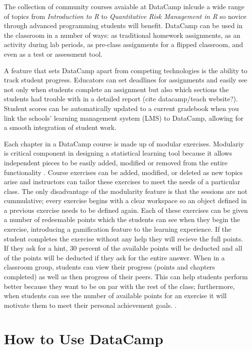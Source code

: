 \documentclass[12pt]{article}
\begin{document}
The collection of community courses avaiable at DataCamp inlcude a wide range of topics from \textit{Introduction to R} to
\textit{Quantitative Risk Management in R} so novice through advanced programming students will benefit.
DataCamp can be used in the classroom in a number of ways: as traditional homework assignments, as an
activity during lab periods, as pre-class assignments for a flipped classroom, and even as a test or assessment tool.

A feature that sets DataCamp apart from competing technologies is the ability to track student progress. Educators
can set deadlines for assignments and easily see not only when students complete an assignment but also which sections the
students had trouble with in a detailed report (cite datacamp/teach website?). Student scores can be automatically updated to a
current gradebook when you link the schools' learning management system (LMS) to DataCamp, allowing for a smooth integration of student work.

Each chapter in a DataCamp course is made up of modular exercises. Modulariy is critical component in designing a statistical
learning tool because it allows independent pieces to be easily added, modified or removed from the entire functionality
\cite{Hare2017}. Course exercises can be added, modified, or deleted as new topics arise and instructors can tailor
these exercises to meet the needs of a particular class. The only disadvantage of the modularity feature is that the sessions
are not cummulative; every exercise begins with a clear workspace so an object defined in a previous exercise needs to be
defined again. Each of these exercises can be given a number of redeemable points which the students can see when they begin
the exercise, introducing a gamification feature to the learning experience. If the student completes the exercise without
any help they will recieve the full points. If they ask for a hint, 30 percent of the available points will be deducted and
all of the points will be deducted if they ask for the entire answer. When in a classroom group, students can view their
progress (points and chapters completed) as well as then progress of their peers. This can help students perform better
because they want to be on par with the rest of the class; furthermore, when students can see the number of available points
for an exercise it will motivate them to meet their personal achievement goals. \citep{Chang2016}.


\section{How to Use DataCamp}
\end{document}
